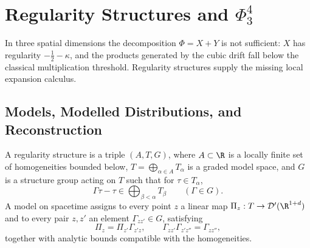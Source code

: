 \section{\texorpdfstring{Regularity Structures and \(\Phi^4_3\)}{Regularity Structures and Phi-four-three}}

In three spatial dimensions the decomposition \(\Phi=X+Y\) is not
sufficient: \(X\) has regularity \(-\frac12-\kappa\), and the products
generated by the cubic drift fall below the classical multiplication
threshold.  Regularity structures supply the missing local expansion
calculus.

\subsection{Models, Modelled Distributions, and Reconstruction}
\label{subsec:spde-regularity-models-reconstruction}

\begin{definition}
\label{def:regularity-structure}
A regularity structure is a triple \((A,T,G)\), where \(A\subset\R\) is a
locally finite set of homogeneities bounded below, \(T=\bigoplus_{\alpha\in
A}T_\alpha\) is a graded model space, and \(G\) is a structure group acting
on \(T\) such that for \(\tau\in T_\alpha\),
\[
  \Gamma\tau-\tau\in\bigoplus_{\beta<\alpha}T_\beta
  \qquad(\Gamma\in G).
\]
A model on spacetime assigns to every point \(z\) a linear map
\(\Pi_z:T\to\mathcal D'(\R^{1+d})\) and to every pair \(z,z'\) an element
\(\Gamma_{zz'}\in G\), satisfying
\[
  \Pi_z=\Pi_{z'}\Gamma_{z'z},\qquad
  \Gamma_{zz'}\Gamma_{z'z''}=\Gamma_{zz''},
\]
together with analytic bounds compatible with the homogeneities.
\end{definition}

